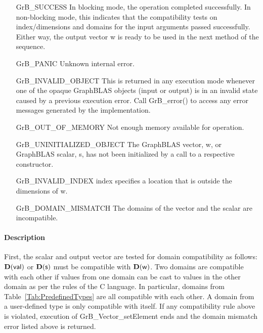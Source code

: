 \begin{itemize}[leftmargin=2.1in]
    \item[{\sf GrB\_SUCCESS}]         In blocking mode, the operation completed
    successfully. In non-blocking mode, this indicates that the compatibility 
    tests on index/dimensions and domains for the input arguments passed successfully. 
    Either way, the output vector {\sf w} is ready to be used in the next method of 
    the sequence.

    \item[{\sf GrB\_PANIC}]   Unknown internal error.
    
    \item[{\sf GrB\_INVALID\_OBJECT}] This is returned in any execution mode 
    whenever one of the opaque GraphBLAS objects (input or output) is in an invalid 
    state caused by a previous execution error.  Call {\sf GrB\_error()} to access 
    any error messages generated by the implementation.

    \item[{\sf GrB\_OUT\_OF\_MEMORY}]  Not enough memory available for operation.
    
    \item[{\sf GrB\_UNINITIALIZED\_OBJECT}]  The GraphBLAS vector, {\sf w}, or 
    GraphBLAS scalar, {\sf s}, has not been initialized by a call to a respective constructor.
    
    \item[{\sf GrB\_INVALID\_INDEX}]  {\sf index} specifies a location 
    that is outside the dimensions of {\sf w}.

    \item[{\sf GrB\_DOMAIN\_MISMATCH}]     The domains of the vector and the scalar
    are incompatible.
\end{itemize}

\paragraph{Description}

First, the scalar and output vector are tested for domain compatibility as follows:
$\mathbf{D}({\sf val})$ or $\mathbf{D}({\sf s})$ must be compatible with $\mathbf{D}({\sf w})$. Two domains 
are compatible with each other if values from one domain can be cast to values 
in the other domain as per the rules of the C language. In particular, domains 
from Table~\ref{Tab:PredefinedTypes} are all compatible with each other. A domain 
from a user-defined type is only compatible with itself. If any compatibility 
rule above is violated, execution of {\sf GrB\_Vector\_setElement} ends and 
the domain mismatch error listed above is returned.

